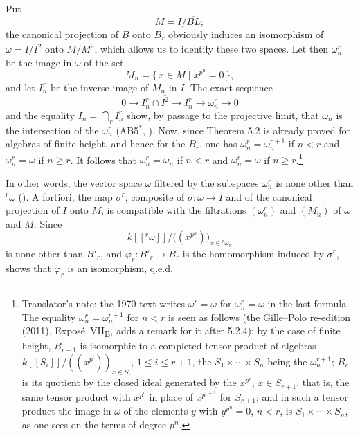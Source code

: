 Put
\[
  M=I/\overline{BL};
\]
the canonical projection of \(B\) onto \(B_r\) obviously induces an
isomorphism of \(\omega=I/\overline{I^2}\) onto \(M/\overline{M^2}\),
which allows us to identify these two spaces. Let then
\(\omega^r_n\) be the image in \(\omega\) of the set
\[
  M_n=\{\,x\in M\mid x^{p^n}=0\,\},
\]
and let \(I^r_n\) be the inverse image of \(M_n\) in \(I\). The exact
sequence
\[
  0\longrightarrow I^r_n\cap\overline{I^2}
  \longrightarrow I^r_n
  \longrightarrow\omega^r_n
  \longrightarrow0
\]
and the equality \(I_n=\bigcap_rI^r_n\) show, by passage to the
projective limit, that \(\omega_n\) is the intersection of the
\(\omega^r_n\) \textup{(AB5\(^*\), )}. Now, since Theorem 5.2 is already
proved for algebras of finite height, and hence for the \(B_r\), one
has \(\omega^r_n=\omega^{r+1}_n\) if \(n<r\) and \(\omega^r_n=\omega\) if
\(n\geq r\). It follows that \(\omega^r_n=\omega_n\) if \(n<r\) and
\(\omega^r_n=\omega\) if \(n\geq r\).\footnote{Translator's note: the 1970 text writes
\(\omega^r=\omega\) for \(\omega^r_n=\omega\) in the last formula. The equality
\(\omega^r_n=\omega^{r+1}_n\) for \(n<r\) is seen as follows (the Gille--Polo re-edition (2011),
Expos\'e~VII\textsubscript{B}, adds a remark for it after 5.2.4): by the case of finite height, \(B_{r+1}\) is
isomorphic to a completed tensor product of algebras \(k[[S_i]]/((x^{p^i}))_{x\in S_i}\), \(1\leq i\leq
r+1\), the \(S_1\times\cdots\times S_n\) being the \(\omega^{r+1}_n\); \(B_r\) is its quotient by the closed
ideal generated by the \(x^{p^r}\), \(x\in S_{r+1}\), that is, the same tensor product with \(x^{p^r}\) in
place of \(x^{p^{r+1}}\) for \(S_{r+1}\); and in such a tensor product the image in \(\omega\) of the elements
\(y\) with \(y^{p^n}=0\), \(n<r\), is \(S_1\times\cdots\times S_n\), as one sees on the terms of degree
\(p^n\).}

In other words, the vector space \(\omega\) filtered by the subspaces
\(\omega^r_n\) is none other than \({}^r\omega\)
\textup{()}. A fortiori, the map \(\sigma^r\), composite of
\(\sigma:\omega\to I\) and of the canonical projection of \(I\) onto
\(M\), is compatible with the filtrations \((\omega^r_n)\) and
\((M_n)\) of \(\omega\) and \(M\). Since
\[
  k[[{}^r\omega]]
  \big/
  \bigl((x^{p^n})\bigr)_{x\in{}^r\omega_n}
\]
is none other than \(B'_r\), and \(\varphi_r:B'_r\to B_r\) is the
homomorphism induced by \(\sigma^r\),  shows that \(\varphi_r\) is an
isomorphism, q.e.d.

